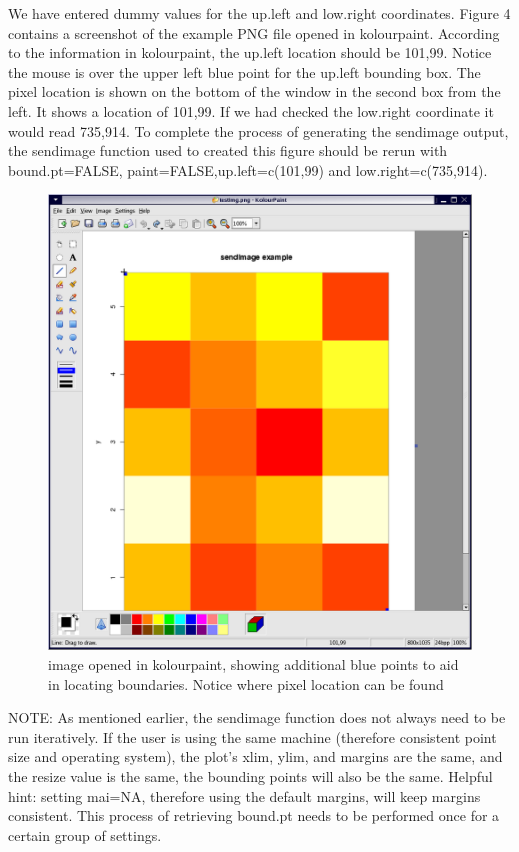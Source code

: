 \documentclass[]{article}
\begin{document}
We have entered dummy values for the up.left and low.right coordinates. Figure 4 contains a screenshot of the example PNG file opened in kolourpaint. According to the information in kolourpaint, the up.left location should be 101,99. Notice the mouse is over the upper left blue point for the up.left bounding box. The pixel location is shown on the bottom of the window in the second box from the left. It shows a location of 101,99. If we had checked the low.right coordinate it would read 735,914. To complete the process of generating the sendimage output, the sendimage function used to created this figure should be rerun with bound.pt=FALSE, paint=FALSE,up.left=c(101,99) and low.right=c(735,914). \newline

\begin{center}
\begin{figure}
\includegraphics{imagePaint}
\caption{image opened in kolourpaint, showing additional blue points to aid in locating boundaries. Notice where pixel location can be found}
\end{figure}
\end{center}

NOTE: As mentioned earlier, the sendimage function does not always need to be run iteratively. If the user is using the same machine (therefore consistent point size and operating system), the plot's xlim, ylim, and margins are the same, and the resize value is the same, the bounding points will also be the same. Helpful hint: setting mai=NA, therefore using the default margins, will keep margins consistent. This process of retrieving bound.pt needs to be performed once for a certain group of settings.\newline
\\
\end{document}

